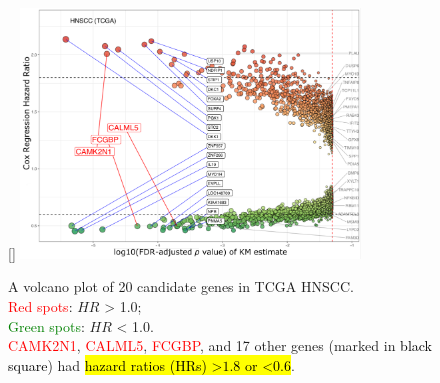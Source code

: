 \documentclass[
paper=landscape,
paper=160mm:90mm, %
fontsize=11pt, %
pagesize, %
parskip=half-, %
]{scrartcl} %
\theoremstyle{mythmstyle} %
\begin{document}

\clearpage

\thispagestyle{headings}

\begin{figure}[ht]

[\FBwidth]
{    \includegraphics[width=9cm]{Rplot_TCGA_HNSCC_CoxHR_CAMK2N1_top3FDRKM.pdf}}
{\captionsetup{labelformat=empty}    
\caption{A volcano plot of 20 candidate genes in TCGA HNSCC.\\
    \textcolor{red}{Red spots}: $HR$ > 1.0;\\
    \textcolor{green}{Green spots}: $HR$ < 1.0.\\
    \textcolor{red}{CAMK2N1}, \textcolor{red}{CALML5}, \textcolor{red}{FCGBP}, and 17 other genes (marked in \textcolor{black}{black square}) had \hl{hazard ratios (HRs) >$1.8$ or <$0.6$}.
    }}
\end{figure}
\end{document}
